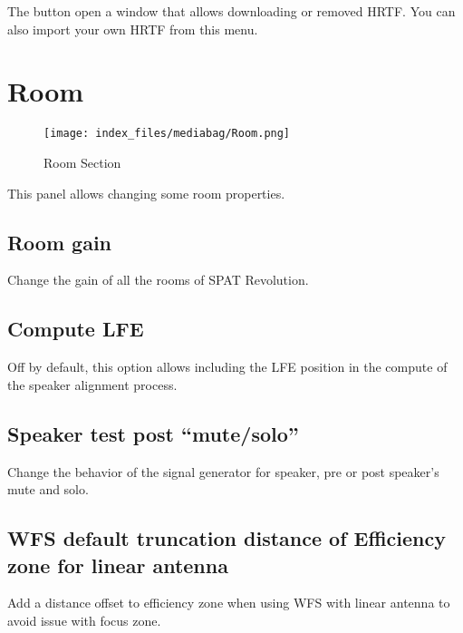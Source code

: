 \documentclass[
  letterpaper,
  DIV=11,
  numbers=noendperiod]{scrreport}
\begin{document}
The button open a window that allows downloading or removed HRTF. You
can also import your own HRTF from this menu.

\hypertarget{room-1}{%
\section{Room}\label{room-1}}

\begin{figure}

{\centering \texttt{[image: index\_files/mediabag/Room.png]}

}

\caption{Room Section}

\end{figure}

This panel allows changing some room properties.

\hypertarget{room-gain}{%
\subsection{Room gain}\label{room-gain}}

Change the gain of all the rooms of SPAT Revolution.

\hypertarget{compute-lfe}{%
\subsection{Compute LFE}\label{compute-lfe}}

Off by default, this option allows including the LFE position in the
compute of the speaker alignment process.

\hypertarget{speaker-test-post-mutesolo}{%
\subsection{Speaker test post
``mute/solo''}\label{speaker-test-post-mutesolo}}

Change the behavior of the signal generator for speaker, pre or post
speaker's mute and solo.

\hypertarget{wfs-default-truncation-distance-of-efficiency-zone-for-linear-antenna}{%
\subsection{WFS default truncation distance of Efficiency zone for
linear
antenna}\label{wfs-default-truncation-distance-of-efficiency-zone-for-linear-antenna}}

Add a distance offset to efficiency zone when using WFS with linear
antenna to avoid issue with focus zone.
\end{document}
